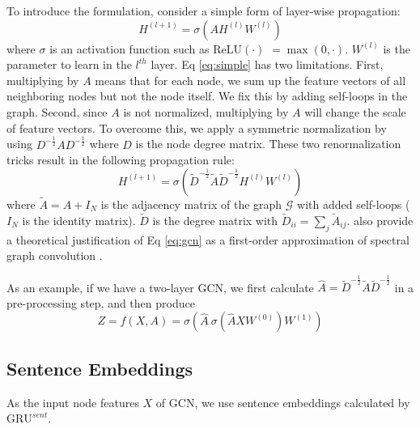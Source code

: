 \documentclass[11pt,a4paper]{article}
\begin{document}
To introduce the formulation, consider a simple form of layer-wise propagation:
\begin{equation}
\label{eq:simple}
    H^{(l+1)} = \sigma\left(AH^{(l)}W^{(l)}\right)
\end{equation}
where $\sigma$ is an activation function such as $\mathrm{ReLU}(\cdot)$ $= \max(0,\cdot)$.
$W^{(l)}$ is the parameter to learn in the $l^{th}$ layer.
Eq \ref{eq:simple} has two limitations.
First, multiplying by $A$ means that for each node, we sum up the feature vectors of all neighboring nodes but not the node itself.
We fix this by adding self-loops in the graph.
Second, since $A$ is not normalized, multiplying by $A$ will change the scale of feature vectors.
To overcome this, we apply a symmetric normalization by using $D^{-\frac12}AD^{-\frac12}$ where $D$ is the node degree matrix.
These two renormalization tricks result in the following propagation rule:
\begin{equation}
\label{eq:gcn}
    H^{(l+1)} = \sigma\left(\tilde{D}^{-\frac{1}{2}}\tilde{A}\tilde{D}^{-\frac{1}{2}}H^{(l)}W^{(l)}\right)
\end{equation}
where $\tilde{A} = A + I_N$ is the adjacency matrix of the graph $\mathcal{G}$ with added self-loops ($I_N$ is the identity matrix). 
$\tilde{D}$ is the degree matrix with $\tilde{D}_{ii} = \sum_{j}\tilde{A}_{ij}$.
 also provide a theoretical justification of Eq \ref{eq:gcn} as a first-order approximation of spectral graph convolution \cite{hammond2011wavelets,defferrard2016convolutional}.

As an example, if we have a two-layer GCN, we first calculate $\hat{A} = \tilde{D}^{-\frac{1}{2}}\tilde{A}\tilde{D}^{-\frac{1}{2}}$ in a pre-processing step, and then produce
\begin{equation*}
    Z = f(X,A) = \sigma\left(\hat{A}\ \sigma\left(\hat{A}XW^{(0)}\right)W^{(1)}\right)
\end{equation*}

\subsection{Sentence Embeddings}
As the input node features $X$ of GCN,  we use sentence embeddings calculated by $\mathrm{GRU}^{sent}$.
\end{document}
